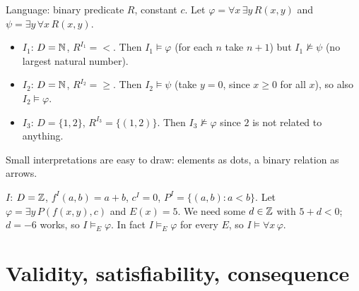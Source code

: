 \begin{example}
Language: binary predicate $R$, constant $c$. Let $\varphi=\forall x\,\exists y\,R(x,y)$
and $\psi = \exists y\,\forall x\,R(x,y)$.
\begin{itemize}
  \item $I_1$: $D=\mathbb{N}$, $R^{I_1}= {<}$. Then $I_1\models\varphi$ (for each $n$ take $n+1$)
        but $I_1\not\models\psi$ (no largest natural number).
  \item $I_2$: $D=\mathbb{N}$, $R^{I_2}={\ge}$. Then $I_2\models\psi$ (take $y=0$, since $x\ge0$
        for all $x$), so also $I_2\models\varphi$.
  \item $I_3$: $D=\{1,2\}$, $R^{I_3}=\{(1,2)\}$. Then $I_3\not\models\varphi$ since $2$
        is not related to anything.
\end{itemize}
Small interpretations are easy to draw: elements as dots, a binary relation as arrows.
\begin{center}
\end{center}
\end{example}

\begin{example}
$I$: $D=\mathbb{Z}$, $f^I(a,b)=a+b$, $c^I=0$, $P^I = \{(a,b): a<b\}$. Let
$\varphi = \exists y\,P(f(x,y),c)$ and $E(x)=5$. We need some $d\in\mathbb{Z}$ with $5+d<0$;
$d=-6$ works, so $I\models_E\varphi$. In fact $I\models_E\varphi$ for every $E$, so
$I\models\forall x\,\varphi$.
\end{example}

\section{Validity, satisfiability, consequence}

